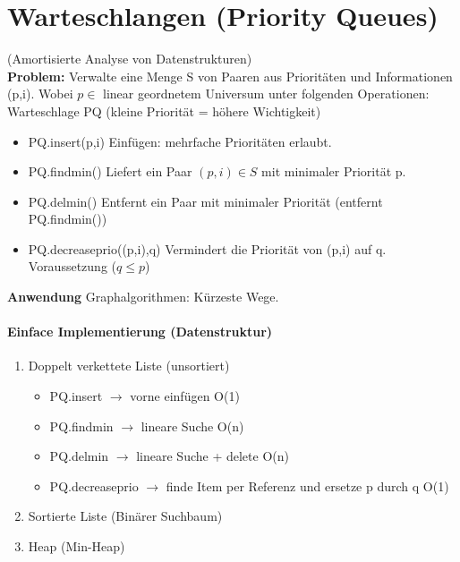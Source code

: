 \section{Warteschlangen (Priority Queues)}
(Amortisierte Analyse von Datenstrukturen)\\

\textbf{Problem:} Verwalte eine Menge S von Paaren aus Prioritäten und Informationen (p,i). Wobei $ p \in $ linear geordnetem Universum unter folgenden Operationen: \\
Warteschlage PQ (kleine Priorität = höhere Wichtigkeit)
\begin{itemize}
    \item PQ.insert(p,i) Einfügen: mehrfache Prioritäten erlaubt.
    \item PQ.findmin() Liefert ein Paar $ (p,i) \in S $ mit minimaler Priorität p.
    \item PQ.delmin() Entfernt ein Paar mit minimaler Priorität (entfernt PQ.findmin()) 
    \item PQ.decreaseprio((p,i),q) Vermindert die Priorität von (p,i) auf q. Voraussetzung ($ q \leq p $)
\end{itemize}

\textbf{Anwendung} Graphalgorithmen: Kürzeste Wege.

\paragraph{Einface Implementierung (Datenstruktur)}
\begin{enumerate}
    \item Doppelt verkettete Liste (unsortiert)
    \begin{itemize}
        \item PQ.insert $ \rightarrow $ vorne einfügen O(1)
        \item PQ.findmin $ \rightarrow $ lineare Suche O(n)
        \item PQ.delmin $ \rightarrow $ lineare Suche + delete O(n)
        \item PQ.decreaseprio $ \rightarrow $ finde Item per Referenz und ersetze p durch q O(1)
    \end{itemize}
    \item Sortierte Liste (Binärer Suchbaum)
    \item Heap (Min-Heap)
\end{enumerate}
